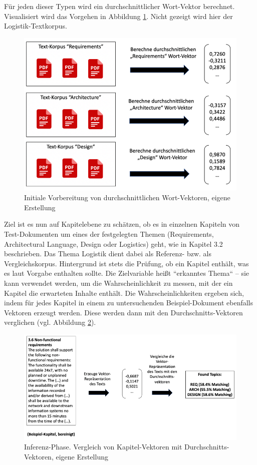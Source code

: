 Für jeden dieser Typen wird ein durchschnittlicher Wort-Vektor berechnet. Visualisiert wird das Vorgehen in Abbildung \ref{Abbildung:avgvec}. Nicht gezeigt wird hier der Logistik-Textkorpus.

\begin{figure}[h]
\centering
\includegraphics[scale=0.95]{content/pics/Picture_16.png}
\caption{Initiale Vorbereitung von durchschnittlichen Wort-Vektoren, eigene Erstellung}
\label{Abbildung:avgvec}
\end{figure}

Ziel ist es nun auf Kapitelebene zu schätzen, ob es in einzelnen Kapiteln von Test-Dokumenten um eines der festgelegten Themen (Requirements, Architectural Language, Design oder Logistics) geht, wie in Kapitel 3.2 beschrieben. Das Thema Logistik dient dabei als Referenz- bzw. als Vergleichskorpus. Hintergrund ist stets die Prüfung, ob ein Kapitel enthält, was es laut Vorgabe enthalten sollte. Die Zielvariable heißt ``erkanntes Thema`` – sie kann verwendet werden, um die Wahrscheinlichkeit zu messen, mit der ein Kapitel die erwarteten Inhalte enthält. Die Wahrscheinlichkeiten ergeben sich, indem für jedes Kapitel in einem zu untersuchenden Beispiel-Dokument ebenfalls Vektoren erzeugt werden. Diese werden dann mit den Durchschnitts-Vektoren verglichen (vgl. Abbildung \ref{Abbildung:avgvec2}). 

\begin{figure}[h]
\centering
\includegraphics[scale=0.95]{content/pics/Picture_17.png}
\caption{Inferenz-Phase. Vergleich von Kapitel-Vektoren mit Durchschnitts-Vektoren, eigene Erstellung}
\label{Abbildung:avgvec2}
\end{figure}

